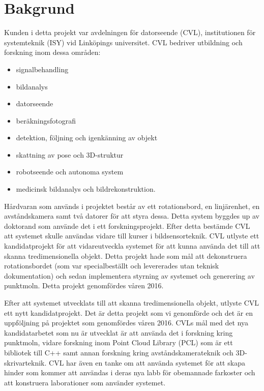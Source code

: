 \chapter{Bakgrund}
\label{cha:background}


Kunden i detta projekt var avdelningen för datorseende (CVL), institutionen för systemteknik (ISY) vid Linköpings universitet. CVL bedriver utbildning och forskning inom dessa områden:
\begin{itemize}
\item signalbehandling
\item bildanalys
\item datorseende
\item beräkningsfotografi
\item detektion, följning och igenkänning av objekt
\item skattning av pose och 3D-struktur
\item robotseende och autonoma system
\item medicinsk bildanalys och bildrekonstruktion.
\end{itemize}
 
Hårdvaran som används i projektet består av ett rotationsbord, en linjärenhet, en avståndskamera samt två datorer för att styra dessa. Detta system byggdes up av doktorand som använde det i ett forskningsprojekt. Efter detta bestämde CVL att systemet skulle användas vidare till kurser i bildsensorteknik. CVL utlyste ett kandidatprojekt för att vidareutveckla systemet för att kunna använda det till att skanna tredimensionella objekt. Detta projekt hade som mål att dekonstruera rotationsbordet (som var specialbeställt och levererades utan teknisk dokumentation) och sedan implementera styrning av systemet och generering av punktmoln. Detta projekt genomfördes våren 2016.

Efter att systemet utvecklats till att skanna tredimensionella objekt, utlyste CVL ett nytt kandidatprojekt. Det är detta projekt som vi genomförde och det är en uppföljning på projektet som genomfördes våren 2016. CVLs mål med det nya kandidatarbetet som nu är utvecklat är att använda det i forskning kring punktmoln, vidare forskning inom Point Cloud Library (PCL) som är ett bibliotek till C++ samt annan forskning kring avståndskamerateknik och 3D-skrivarteknik. CVL har även en tanke om att använda systemet för att skapa hinder som kommer att användas i deras nya labb för obemannade farkoster och att konstruera laborationer som använder systemet.

